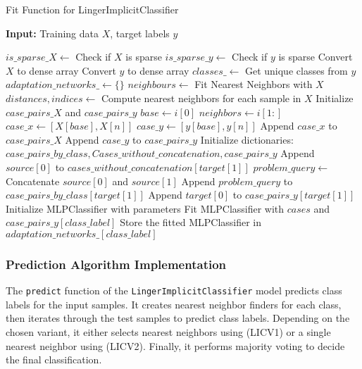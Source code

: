 \documentclass[a4paper, 12pt]{report}
\begin{document}
\begin{algorithm}[H]
    \caption{Fit Function for LingerImplicitClassifier}
    \textbf{Input:} Training data $X$, target labels $y$
    \label{alg:linger_implicit_classifier_fit_implementation}
    \begin{algorithmic}[1]
            \State $is\_sparse\_X \gets$ Check if $X$ is sparse
            \State $is\_sparse\_y \gets$ Check if $y$ is sparse
                \State Convert $X$ to dense array
            \EndIf
                \State Convert $y$ to dense array
            \EndIf
            \State $classes\_ \gets$ Get unique classes from $y$
            \State $adaptation\_networks\_ \gets \{\}$
            \State $neighbours \gets$ Fit Nearest Neighbors with $X$
            \State $distances, indices \gets$ Compute nearest neighbors for each sample in $X$
            \State Initialize $case\_pairs\_X$ and $case\_pairs\_y$
                \State $base \gets i[0]$
                \State $neighbors \gets i[1:]$
                    \State $case\_x \gets [X[base],  X[n]]$
                    \State $case\_y \gets [y[base], y[n]]$
                    \State Append $case\_x$ to $case\_pairs\_X$
                    \State Append $case\_y$ to $case\_pairs\_y$
                \EndFor
            \EndFor
            \State Initialize dictionaries: $case\_pairs\_by\_class,Cases\_without\_concatenation,case\_pairs\_y$
                \State Append $source[0]$ to $cases\_without\_concatenation[target[1]]$
                \State $problem\_query \gets$ Concatenate $source[0]$ and $source[1]$
                \State Append $problem\_query$ to $case\_pairs\_by\_class[target[1]]$
                \State Append $target[0]$ to $case\_pairs\_y[target[1]]$
            \EndFor
                \State Initialize MLPClassifier with parameters
                \State Fit MLPClassifier with $cases$ and $case\_pairs\_y[class\_label]$
                \State Store the fitted MLPClassifier in $adaptation\_networks\_[class\_label]$
            \EndFor
        \EndFunction
    \end{algorithmic}
\end{algorithm}
\subsubsection{Prediction Algorithm Implementation}
\label{sec:prediction_implementation_LIC}
The \texttt{predict} function of the \texttt{LingerImplicitClassifier} model predicts class labels for the input samples. 
It creates nearest neighbor finders for each class, then iterates through the test samples to predict class labels. 
Depending on the chosen variant, it either selects nearest neighbors using (LICV1) or a single nearest neighbor using (LICV2). 
Finally, it performs majority voting to decide the final classification.
\end{document}
